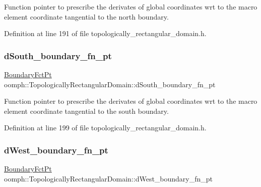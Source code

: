 Function pointer to prescribe the derivates of global coordinates wrt to the macro element coordinate tangential to the north boundary. 



Definition at line 191 of file topologically\+\_\+rectangular\+\_\+domain.\+h.

\mbox{\label{classoomph_1_1TopologicallyRectangularDomain_aeaea9592b94d26a6a23f4f425ee7cd37}} 
\subsubsection{\texorpdfstring{d\+South\+\_\+boundary\+\_\+fn\+\_\+pt}{dSouth\_boundary\_fn\_pt}}
{\footnotesize\ttfamily \hyperlink{classoomph_1_1TopologicallyRectangularDomain_a8b2e24f5500d86c93aef509c5410e7cc}{Boundary\+Fct\+Pt} oomph\+::\+Topologically\+Rectangular\+Domain\+::d\+South\+\_\+boundary\+\_\+fn\+\_\+pt\hspace{0.3cm}{\ttfamily [private]}}



Function pointer to prescribe the derivates of global coordinates wrt to the macro element coordinate tangential to the south boundary. 



Definition at line 199 of file topologically\+\_\+rectangular\+\_\+domain.\+h.

\mbox{\label{classoomph_1_1TopologicallyRectangularDomain_a8e3abcbc75bab984017cb974d81db41e}} 
\subsubsection{\texorpdfstring{d\+West\+\_\+boundary\+\_\+fn\+\_\+pt}{dWest\_boundary\_fn\_pt}}
{\footnotesize\ttfamily \hyperlink{classoomph_1_1TopologicallyRectangularDomain_a8b2e24f5500d86c93aef509c5410e7cc}{Boundary\+Fct\+Pt} oomph\+::\+Topologically\+Rectangular\+Domain\+::d\+West\+\_\+boundary\+\_\+fn\+\_\+pt\hspace{0.3cm}{\ttfamily [private]}}



